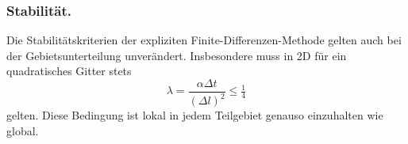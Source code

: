 \subsubsection {Stabilität.}
Die Stabilitätskriterien der expliziten Finite-Differenzen-Methode gelten auch bei der Gebietsunterteilung unverändert.  
Insbesondere muss in 2D für ein quadratisches Gitter stets
\[
\lambda = \frac{\alpha \Delta t}{(\Delta l)^2} \leq \tfrac{1}{4}
\]
gelten.  
Diese Bedingung ist lokal in jedem Teilgebiet genauso einzuhalten wie global.  


